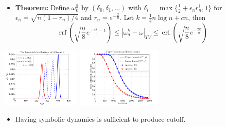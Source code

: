 \documentclass[12pt,t]{beamer}
\begin{document}
\begin{frame}
  \begin{itemize}
  \item \textbf{Theorem:} Define $\omega_n^0$ by $(\delta_0, \delta_1,
    \ldots)$ with $\delta_i = \max\{\frac{1}{2}+\epsilon_n r_n^i,1\}$
    for $\epsilon_n = \sqrt{n(1-r_n)/4}$ and $r_n = e^{-\frac{2}{n}}$.
    Let $k = \frac{1}{4}n\log{n}+cn $, then
    \begin{equation*}
      \operatorname*{erf}\left(\sqrt{\frac{n}{8}}e^{-\frac{2k}{n}-1}  \right)
      \le |\omega^k_n - \bar{\omega}|_{TV}
      \le \operatorname*{erf}\left(\sqrt{\frac{n}{8}}e^{-\frac{2k}{n}}  \right)
    \end{equation*}
  \end{itemize}
  \begin{center}
    \includegraphics[height=3cm]{deltaMexample2a}
    \includegraphics[height=3cm]{deltaMexample2b}
  \end{center}
  \begin{itemize}
  \item Having symbolic dynamics is sufficient to produce cutoff.
  \end{itemize}
\end{frame}
\end{document}
